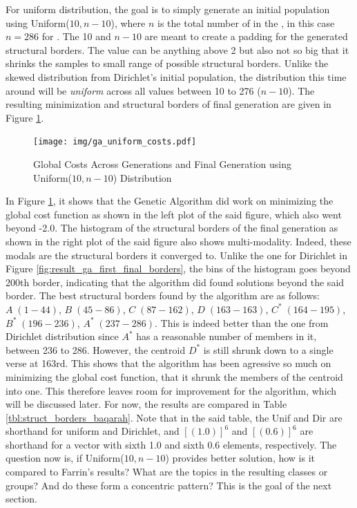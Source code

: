 For uniform distribution, the goal is to simply generate an initial population using Uniform($10,n-10$), where $n$ is the total number of   in the  , in this case $n=286$ for  . The 10 and $n-10$ are meant to create a padding for the generated structural borders. The value can be anything above 2 but also not so big that it shrinks the samples to small range of possible structural borders. Unlike the skewed distribution from Dirichlet's initial population, the distribution this time around will be \textit{uniform} across all values between 10 to 276 ($n-10$). The resulting minimization and structural borders of final generation are given in Figure \ref{fig:result_ga_uniform}. 

\begin{figure}[!t]
    \centering
    \texttt{[image: img/ga\_uniform\_costs.pdf]}
    \caption{Global Costs Across Generations and Final Generation using Uniform($10,n-10$) Distribution}
    \label{fig:result_ga_uniform}
\end{figure}

In Figure \ref{fig:result_ga_uniform}, it shows that the Genetic Algorithm did work on minimizing the global cost function as shown in the left plot of the said figure, which also went beyond -2.0. The histogram of the structural borders of the final generation as shown in the right plot of the said figure also shows multi-modality. Indeed, these modals are the structural borders it converged to. Unlike the one for Dirichlet in Figure \ref{fig:result_ga_first_final_borders}, the bins of the histogram goes beyond 200th border, indicating that the algorithm did found solutions beyond the said border. The best structural borders found by the algorithm are as follows: $A\;(1-44)$, $B\;(45-86)$, $C\;(87-162)$, $D\;(163-163)$, $C^*\;(164-195)$, $B^*\;(196-236)$, $A^*\;(237-286)$. This is indeed better than the one from Dirichlet distribution since $A^*$ has a reasonable number of members in it, between   236 to 286. However, the centroid $D^*$ is still shrunk down to a single verse at 163rd. This shows that the algorithm has been agressive so much on minimizing the global cost function, that it shrunk the members of the centroid into one. This therefore leaves room for improvement for the algorithm, which will be discussed later. For now, the results are compared in Table \ref{tbl:struct_borders_baqarah}. Note that in the said table, the Unif and Dir are shorthand for uniform and Dirichlet, and $[(1.0)]^6$ and $[(0.6)]^6$ are shorthand for a vector with sixth 1.0 and sixth 0.6 elements, respectively. The question now is, if Uniform($10,n-10$) provides better solution, how is it compared to Farrin's results? What are the topics in the resulting classes or groups? And do these form a concentric pattern? This is the goal of the next section.

